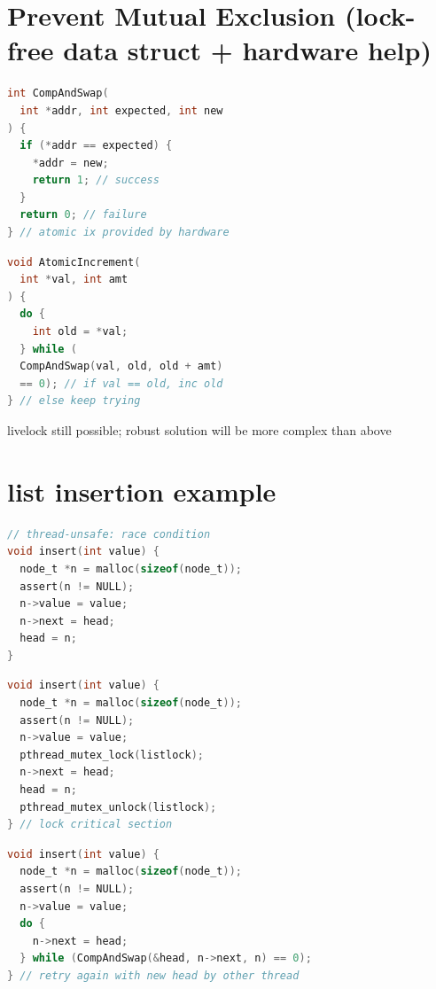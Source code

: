 \section*{Prevent Mutual Exclusion (lock-free data struct + hardware help)}
\begin{minipage}{0.5\linewidth}
\begin{lstlisting}[language=c]
int CompAndSwap(
  int *addr, int expected, int new
) {
  if (*addr == expected) {
    *addr = new;
    return 1; // success
  }
  return 0; // failure
} // atomic ix provided by hardware
\end{lstlisting}
\end{minipage}
\begin{minipage}{0.5\linewidth}
\begin{lstlisting}[language=c,xleftmargin=2pt]
void AtomicIncrement(
  int *val, int amt
) {
  do {
    int old = *val;
  } while (
  CompAndSwap(val, old, old + amt)
  == 0); // if val == old, inc old
} // else keep trying
\end{lstlisting}
\end{minipage}
livelock still possible; robust solution will be more complex than above\newline
\begin{minipage}{0.55\linewidth}
\section*{list insertion example}
\begin{lstlisting}[language=c,frame=none,xleftmargin=-6pt]
// thread-unsafe: race condition
void insert(int value) {
  node_t *n = malloc(sizeof(node_t));
  assert(n != NULL);
  n->value = value;
  n->next = head;
  head = n;
}
\end{lstlisting}
\end{minipage}
\begin{minipage}{0.5\linewidth}
\begin{lstlisting}[language=c,frame=none,xleftmargin=-18pt]
void insert(int value) {
  node_t *n = malloc(sizeof(node_t));
  assert(n != NULL);
  n->value = value;
  pthread_mutex_lock(listlock);
  n->next = head;
  head = n;
  pthread_mutex_unlock(listlock);
} // lock critical section
\end{lstlisting}
\end{minipage}
\begin{minipage}{0.68\linewidth}
\begin{lstlisting}[language=c]
void insert(int value) {
  node_t *n = malloc(sizeof(node_t));
  assert(n != NULL);
  n->value = value;
  do {
    n->next = head;
  } while (CompAndSwap(&head, n->next, n) == 0);
} // retry again with new head by other thread
\end{lstlisting}
\end{minipage}
